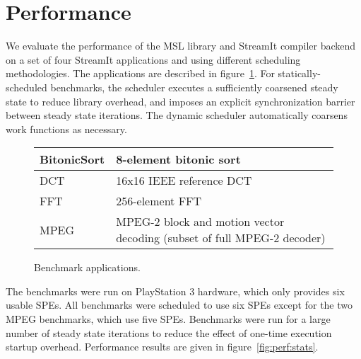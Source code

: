 \section{Performance}\label{ch:perf}

We evaluate the performance of the MSL library and StreamIt compiler backend
on a set of four StreamIt applications and using different scheduling
methodologies. The applications are described in figure~\ref{fig:perf:apps}.
For statically-scheduled benchmarks, the scheduler executes a sufficiently
coarsened steady state to reduce library overhead, and imposes an explicit
synchronization barrier between steady state iterations. The dynamic scheduler
automatically coarsens work functions as necessary.

\begin{figure}[!htb]
\begin{center}
\begin{tabular}{|l|p{2.25in}|}
\hline
BitonicSort & 8-element bitonic sort \\
\hline
DCT         & 16x16 IEEE reference DCT \\
\hline
FFT         & 256-element FFT \\
\hline
MPEG        & MPEG-2 block and motion vector decoding (subset of full MPEG-2 decoder) \\
\hline
\end{tabular}
\end{center}
\caption{Benchmark applications.}
\label{fig:perf:apps}
\end{figure}

The benchmarks were run on PlayStation 3 hardware, which only provides
six usable SPEs. All benchmarks were scheduled to use six SPEs except
for the two MPEG benchmarks, which use five SPEs.
Benchmarks were run for a large number of steady state iterations
to reduce the effect of one-time execution startup overhead.
Performance results are given in figure~\ref{fig:perf:stats}.

